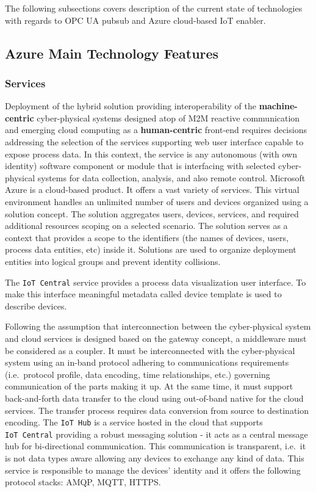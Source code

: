 \documentclass{jacsart}
\begin{document}
The following subsections covers description of the current state of technologies with regards to OPC UA pubsub and Azure cloud-based IoT enabler.

\hypertarget{azure-main-technology-features}{%
  \subsection{Azure Main Technology Features}\label{azure-main-technology-features}}

\hypertarget{services}{%
  \subsubsection{Services}\label{services}}

Deployment of the hybrid solution providing interoperability of the
\textbf{machine-centric} cyber-physical systems designed atop of M2M
reactive communication and emerging cloud computing as a
\textbf{human-centric} front-end requires decisions addressing the
selection of the services supporting web user interface capable to
expose process data. In this context, the service is any
autonomous (with own identity) software component or module that is
interfacing with selected cyber-physical systems for data collection,
analysis, and also remote control. Microsoft Azure is a cloud-based
product. It offers a vast variety of services. This virtual environment
handles an unlimited number of users and devices organized using a
solution concept. The solution aggregates users, devices, services, and
required additional resources scoping on a selected scenario. The
solution serves as a context that provides a scope to the identifiers
(the names of devices, users, process data entities, etc) inside it.
Solutions are used to organize deployment entities into logical groups
and prevent identity collisions.

The \texttt{IoT\ Central} service provides a process data visualization
user interface. To make this interface meaningful metadata called device
template is used to describe devices.

Following the assumption that interconnection between the cyber-physical
system and cloud services is designed based on the gateway concept, a
middleware must be considered as a coupler. It must be interconnected
with the cyber-physical system using an in-band protocol adhering to
communications requirements (i.e.~protocol profile, data encoding, time
relationships, etc.) governing communication of the parts making it up.
At the same time, it must support back-and-forth data transfer to the
cloud using out-of-band native for the cloud services. The transfer
process requires data conversion from source to destination encoding.
The \texttt{IoT\ Hub} is a service hosted in the cloud that supports
\texttt{IoT\ Central} providing a robust messaging solution - it acts as
a central message hub for bi-directional communication. This
communication is transparent, i.e.~it is not data types aware allowing
any devices to exchange any kind of data. This service is responsible to
manage the devices' identity and it offers the following protocol
stacks: AMQP, MQTT, HTTPS.
\end{document}
